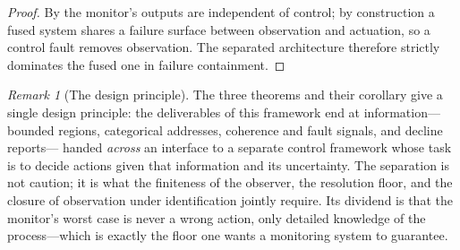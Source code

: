 \documentclass[11pt,twocolumn,a4paper]{article}
\theoremstyle{thmstyle}
\theoremstyle{definition}
\theoremstyle{remark}
\newtheorem{remark}[theorem]{Remark}
\begin{document}
\begin{proof}
By  the monitor's outputs are independent of control;
by construction a fused system shares a failure surface between observation
and actuation, so a control fault removes observation. The separated
architecture therefore strictly dominates the fused one in failure
containment.
\end{proof}

\begin{remark}[The design principle]
\label{rem:design-principle}
The three theorems and their corollary give a single design principle: the
deliverables of this framework end at information---bounded regions,
categorical addresses, coherence and fault signals, and decline reports---
handed \emph{across} an interface to a separate control framework whose task
is to decide actions given that information and its uncertainty. The
separation is not caution; it is what the finiteness of the observer, the
resolution floor, and the closure of observation under identification
jointly require. Its dividend is that the monitor's worst case is never a
wrong action, only detailed knowledge of the process---which is exactly the
floor one wants a monitoring system to guarantee.
\end{remark}
\end{document}
